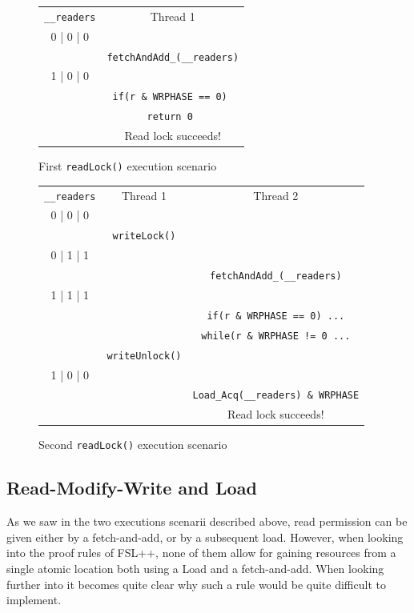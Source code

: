 \begin{figure}
\begin{tabular}{c||c}
	\texttt{\_\_readers} & Thread 1\\
	0 | 0 | 0 & \\
	 &   \texttt{fetchAndAdd\_(\_\_readers)} \\
	1 | 0 | 0 & \\
	 & \texttt{if(r \& WRPHASE == 0) } \\
	& \texttt{return 0 } \\
	&  Read lock succeeds!
\end{tabular}

		\caption{First \texttt{readLock()} execution scenario}
		\label{fig:scen1}
\end{figure}
\begin{figure}
\begin{tabular}{c||c|c}
	\texttt{\_\_readers} & Thread 1 & Thread 2 \\
	0 | 0 | 0 & & \\
	 & \texttt{writeLock()} & \\
	0 | 1 | 1 &   & \\
	 &   & \texttt{fetchAndAdd\_(\_\_readers)} \\
	1 | 1 | 1 & & \\
		& & \texttt{if(r \& WRPHASE == 0) ...} \\
		& & \texttt{while(r \& WRPHASE != 0 ...} \\
	 & \texttt{writeUnlock()} & \\
		1 | 0 | 0 & & \\
		& & \texttt{Load\_Acq(\_\_readers) \& WRPHASE} \\
		& & Read lock succeeds!
\end{tabular}

		\caption{Second \texttt{readLock()} execution scenario}
		\label{fig:scen2}
\end{figure}


		\subsection{Read-Modify-Write and Load}
	\label{subsec:glibcRWPb}
As we saw in the two executions scenarii described above, read permission can be given either by a fetch-and-add, or by a subsequent load. However, when looking into the proof rules of FSL++, none of them allow for gaining resources from a single atomic location both using a Load and a fetch-and-add. When looking further into it becomes quite clear why such a rule would be quite difficult to implement.

